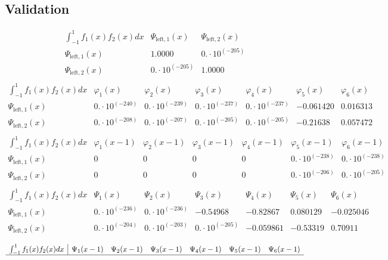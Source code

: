 \documentclass{article}
\begin{document}
 \begin{landscape}
 \subsection{Validation}$$ \begin{array}{l|ll}
\int_{-1}^1 f_1(x)f_2(x) dx& \Psi_{\text{left},1}(x)& \Psi_{\text{left},2}(x) \\ \hline 
 \Psi_{\text{left},1}(x) & 1.0000 & 0.\cdot 10^{(-205)} \\ 
\Psi_{\text{left},2}(x) & 0.\cdot 10^{(-205)} & 1.0000 \\ 
\end{array} $$
$$ \begin{array}{l|llllll}
\int_{-1}^1 f_1(x)f_2(x) dx& \varphi_1(x)& \varphi_2(x)& \varphi_3(x)& \varphi_4(x)& \varphi_5(x)& \varphi_6(x) \\ \hline 
 \Psi_{\text{left},1}(x) & 0.\cdot 10^{(-240)} & 0.\cdot 10^{(-239)} & 0.\cdot 10^{(-237)} & 0.\cdot 10^{(-237)} & -0.061420 & 0.016313 \\ 
\Psi_{\text{left},2}(x) & 0.\cdot 10^{(-208)} & 0.\cdot 10^{(-207)} & 0.\cdot 10^{(-205)} & 0.\cdot 10^{(-205)} & -0.21638 & 0.057472 \\ 
\end{array} $$ 
$$ \begin{array}{l|llllll}
\int_{-1}^1 f_1(x)f_2(x) dx& \varphi_1(x-1)& \varphi_2(x-1)& \varphi_3(x-1)& \varphi_4(x-1)& \varphi_5(x-1)& \varphi_6(x-1) \\ \hline 
 \Psi_{\text{left},1}(x) & 0 & 0 & 0 & 0 & 0.\cdot 10^{(-238)} & 0.\cdot 10^{(-238)} \\ 
\Psi_{\text{left},2}(x) & 0 & 0 & 0 & 0 & 0.\cdot 10^{(-206)} & 0.\cdot 10^{(-205)} \\ 
\end{array} $$ 
$$ \begin{array}{l|llllll}
\int_{-1}^1 f_1(x)f_2(x) dx& \Psi_1(x)& \Psi_2(x)& \Psi_3(x)& \Psi_4(x)& \Psi_5(x)& \Psi_6(x) \\ \hline 
 \Psi_{\text{left},1}(x) & 0.\cdot 10^{(-236)} & 0.\cdot 10^{(-236)} & -0.54968 & -0.82867 & 0.080129 & -0.025046 \\ 
\Psi_{\text{left},2}(x) & 0.\cdot 10^{(-204)} & 0.\cdot 10^{(-203)} & 0.\cdot 10^{(-205)} & -0.059861 & -0.53319 & 0.70911 \\ 
\end{array} $$ 
$$ \begin{array}{l|llllll}
\int_{-1}^1 f_1(x)f_2(x) dx& \Psi_1(x-1)& \Psi_2(x-1)& \Psi_3(x-1)& \Psi_4(x-1)& \Psi_5(x-1)& \Psi_6(x-1) \\ \hline 

\end{array}$$
\end{landscape}
\end{document}
